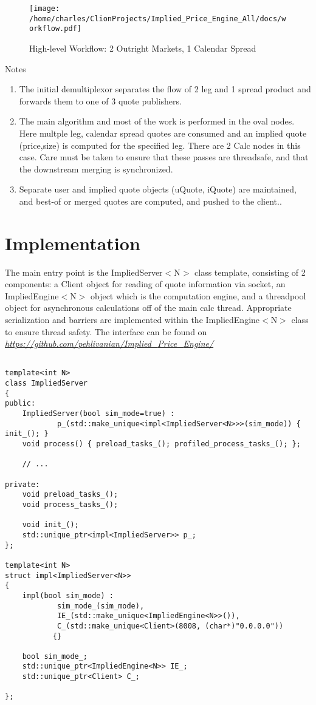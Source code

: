\documentclass{article}
\begin{document}
\clearpage
\begin{figure}
\centering
\texttt{[image: /home/charles/ClionProjects/Implied\_Price\_Engine\_All/docs/workflow.pdf]}
\caption{High-level Workflow: 2 Outright Markets, 1 Calendar Spread}
\end{figure}

Notes
\begin{enumerate}
\item The initial demultiplexor separates the flow of 2 leg and 1 spread product and forwards them to one of 3 quote publishers.
\item The main algorithm and most of the work is performed in the oval nodes. Here multple leg, calendar spread quotes are consumed and an implied quote (price,size) is computed for the specified leg. There are 2 Calc nodes in this case. Care must be taken to ensure that these passes are threadsafe, and that the downstream merging is synchronized.
\item Separate user and implied quote objects (uQuote, iQuote) are maintained, and best-of or merged quotes are computed, and pushed to the client..
\end{enumerate}

\section*{Implementation}
The main entry point is the ImpliedServer$<$N$>$ class template, consisting of 2 components: a Client object for reading of quote information via socket, an ImpliedEngine$<$N$>$ object which is the computation engine, and a threadpool object for asynchronous calculations off of the main calc thread. Appropriate serialization and barriers are implemented within the ImpliedEngine$<$N$>$ class to ensure thread safety. The interface can be found on \href{https://github.com/pehlivanian/Implied_Price_Engine}{\it https://github.com/pehlivanian/Implied{\_}Price{\_}Engine/}

\begin{verbatim}

template<int N>
class ImpliedServer
{
public:
    ImpliedServer(bool sim_mode=true) :
            p_(std::make_unique<impl<ImpliedServer<N>>>(sim_mode)) { init_(); }
    void process() { preload_tasks_(); profiled_process_tasks_(); };

    // ...

private:
    void preload_tasks_();
    void process_tasks_();

    void init_();
    std::unique_ptr<impl<ImpliedServer>> p_;
};

template<int N>
struct impl<ImpliedServer<N>>
{
    impl(bool sim_mode) :
            sim_mode_(sim_mode),
            IE_(std::make_unique<ImpliedEngine<N>>()),
            C_(std::make_unique<Client>(8008, (char*)"0.0.0.0"))
           {}

    bool sim_mode_;
    std::unique_ptr<ImpliedEngine<N>> IE_;
    std::unique_ptr<Client> C_;

};

\end{verbatim}
\end{document}
